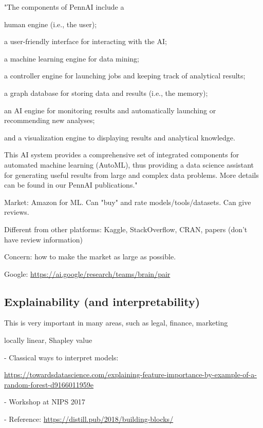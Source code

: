 \documentclass[english]{article}
\begin{document}
\item "The components of PennAI include a 

human engine (i.e., the user); 

a user-friendly interface for interacting with the AI; 

a machine learning engine for data mining; 

a controller engine for launching jobs and keeping track of analytical results; 

a graph database for storing data and results (i.e., the memory); 

an AI engine for monitoring results and automatically launching or recommending new analyses; 

and a visualization engine to displaying results and analytical knowledge. 

This AI system provides a comprehensive set of integrated components for automated machine learning (AutoML), thus providing a data science assistant for generating useful results from large and complex data problems. More details can be found in our PennAI publications."

\item Market: Amazon for ML. Can "buy" and rate models/tools/datasets. Can give reviews. 

Different from other platforms: Kaggle, StackOverflow, CRAN, papers (don't have review information)

Concern: how to make the market as large as possible.  

\item Google: \url{https://ai.google/research/teams/brain/pair}
\eenum 


\subsection{Explainability (and interpretability)}


\benum 
\item This is very important in many areas, such as legal, finance, marketing

locally linear, Shapley value

- Classical ways to interpret models: 

\url{https://towardsdatascience.com/explaining-feature-importance-by-example-of-a-random-forest-d9166011959e}

- Workshop at NIPS 2017

- Reference: \url{https://distill.pub/2018/building-blocks/}
\end{document}
